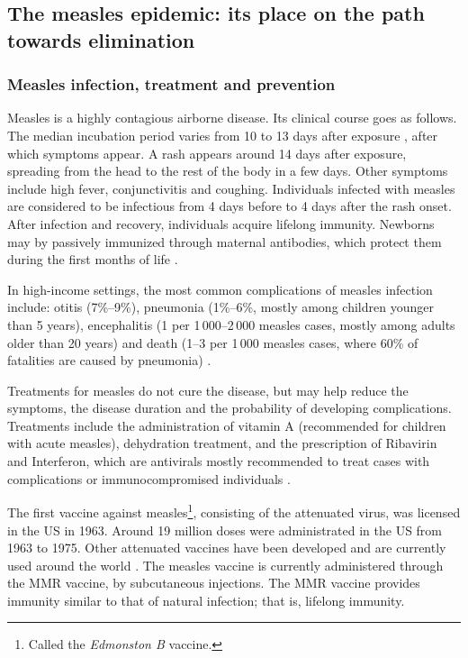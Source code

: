 \subsection{The measles epidemic: its place on the path towards elimination}

\subsubsection{Measles infection, treatment and prevention}
Measles is a highly contagious airborne disease. Its clinical course goes as follows. The median incubation period varies from 10 to 13 days after exposure \cite[]{CDC_Measles2015,Strebel2013}, after which symptoms appear. A rash appears around 14 days after exposure, spreading from the head to the rest of the body in a few days. Other symptoms include high fever, conjunctivitis and coughing. Individuals infected with measles are considered to be infectious from 4 days before to 4 days after the rash onset. After infection and recovery, individuals acquire lifelong immunity. Newborns may by passively immunized through maternal antibodies, which protect them during the first months of life \cite[]{Strebel2013}.

In high-income settings, the most common complications of measles infection include: otitis (7\%--9\%), pneumonia (1\%--6\%, mostly among children younger than 5 years), encephalitis (1 per 1\,000--2\,000 measles cases, mostly among adults older than 20 years) and death (1--3 per 1\,000 measles cases, where 60\% of fatalities are caused by pneumonia) \cite[]{Strebel2013}.

Treatments for measles do not cure the disease, but may help reduce the symptoms, the disease duration and the probability of developing complications. Treatments include the administration of vitamin A (recommended for children with acute measles), dehydration treatment, and the prescription of Ribavirin and Interferon, which are antivirals mostly recommended to treat cases with complications or immunocompromised individuals \cite[]{Strebel2013}.

The first vaccine against measles\footnote{Called the {\it Edmonston B} vaccine.}, consisting of the attenuated virus, was licensed in the US in 1963. Around 19 million doses were administrated in the US from 1963 to 1975. Other attenuated vaccines have been developed and are currently used around the world \cite[]{Strebel2013}. The measles vaccine is currently administered through the MMR vaccine, by subcutaneous injections. The MMR vaccine provides immunity similar to that of natural infection; that is, lifelong immunity. 

